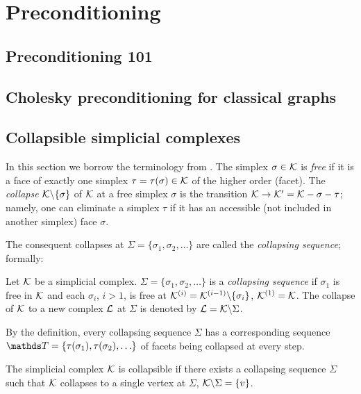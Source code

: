 \section{Preconditioning}

\subsection{Preconditioning 101}

\subsection{Cholesky preconditioning for classical graphs}

\subsection{Collapsible simplicial complexes}


In this section we borrow the terminology from \cite{whiteheadSimplicialSpacesNuclei1939}. 
 The simplex \(\sigma \in \mathcal{K} \) is \emph{free} if it is a face of exactly one simplex \(\tau = \tau(\sigma) \in \mathcal{K} \) of the higher order (facet).  The \emph{collapse} \( \mathcal{K} \backslash \{ \sigma \} \) of \( \mathcal{K} \) at a free simplex \( \sigma \) is the transition \( \mathcal{K} \to \mathcal{K}' = \mathcal{K} - \sigma - \tau \); namely, one can eliminate a simplex \( \tau \) if it has an accessible (not included in another simplex) face \(\sigma\).

 The consequent collapses at \( \Sigma = \{ \sigma_1, \sigma_2, \ldots \} \) are called the \emph{collapsing sequence}; formally:
 \begin{definition}
       Let \( \mathcal{K} \) be a simplicial complex. \( \Sigma = \{ \sigma_1, \sigma_2, \ldots \} \) is a \emph{collapsing sequence} if \( \sigma_1 \) is free in \( \mathcal{K} \) and each \( \sigma_i \), \( i > 1 \), is free at 
       \( \mathcal{K}^{(i)} = \mathcal{K}^{(i-1)} \backslash \{ \sigma_i \} \), \( \mathcal{K}^{(1)} = \mathcal{K} \). The collapse of \( \mathcal{K} \) to a new complex \( \mathcal{L} \) at \( \Sigma \) is denoted by \( \mathcal{L} = \mathcal{K} \backslash \Sigma \).
 \end{definition}
 By the definition, every collapsing sequence \( \Sigma \) has a corresponding sequence \( \ds T = \{ \tau(\sigma_1), \tau(\sigma_2), \ldots \} \) of facets being collapsed at every step.

 \begin{definition}
      The simplicial complex \( \mathcal{K} \) is collapsible if there exists a collapsing sequence \( \Sigma \) such that \( \mathcal{K} \) collapses to a single vertex at \( \Sigma \), \( \mathcal{K} \backslash \Sigma = \{ v \} \).
\end{definition}

